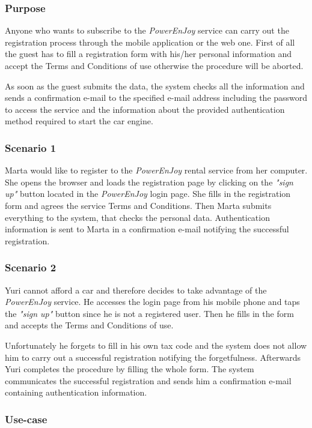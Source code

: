 \subsubsection{Purpose}
Anyone who wants to subscribe to the \emph{PowerEnJoy} service can carry out the registration process through the mobile application or the web one. First of all the guest has to fill a registration form with his/her personal information and accept the Terms and Conditions of use otherwise the procedure will be aborted.

As soon as the guest submits the data, the system checks all the information and sends a confirmation e-mail to the specified e-mail address including the password to access the service and the information about the provided authentication method required to start the car engine.

\subsubsection{Scenario 1}
Marta would like to register to the \emph{PowerEnJoy} rental service from her computer. She opens the browser and loads the registration page by clicking on the \emph{"sign up"} button located in the \emph{PowerEnJoy} login page. She fills in the registration form and agrees the service Terms and Conditions. Then Marta submits everything to the system, that checks the personal data. Authentication information is sent to Marta in a confirmation e-mail notifying the successful registration.

\subsubsection{Scenario 2}
Yuri cannot afford a car and therefore decides to take advantage of the \emph{PowerEnJoy} service. He accesses the login page from his mobile phone and taps the \emph{"sign up"} button since he is not a registered user. Then he fills in the form and accepts the Terms and Conditions of use.

Unfortunately he forgets to fill in his own tax code and the system does not allow him to carry out a successful registration notifying the forgetfulness. Afterwards Yuri completes the procedure by filling the whole form. The system communicates the successful registration and sends him a confirmation e-mail containing authentication information.

\subsubsection{Use-case}


